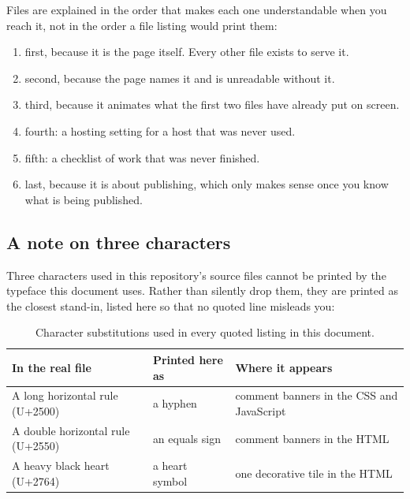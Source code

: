 \documentclass[11pt,a4paper]{article}
\begin{document}
Files are explained in the order that makes each one understandable when you
reach it, not in the order a file listing would print them:

\begin{enumerate}
\item {} first, because it is the page
  itself. Every other file exists to serve it.
\item {} second, because the page names it
  and is unreadable without it.
\item {} third, because it animates what the
  first two files have already put on screen.
\item {} fourth: a hosting setting for a
  host that was never used.
\item {} fifth: a checklist of work
  that was never finished.
\item {} last, because it is
  about publishing, which only makes sense once you know what is being
  published.
\end{enumerate}

\subsection{A note on three characters}

Three characters used in this repository's source files cannot be printed by the
typeface this document uses. Rather than silently drop them, they are printed as
the closest stand-in, listed here so that no quoted line misleads you:

\begin{table}[H]\centering\small
\begin{tabular}{@{}lll@{}}
\toprule
In the real file & Printed here as & Where it appears \\
\midrule
A long horizontal rule (U+2500) & a hyphen & comment banners in the CSS and JavaScript \\
A double horizontal rule (U+2550) & an equals sign & comment banners in the HTML \\
A heavy black heart (U+2764) & a heart symbol & one decorative tile in the HTML \\
\bottomrule
\end{tabular}
\caption{Character substitutions used in every quoted listing in this document.}
\end{table}
\end{document}
